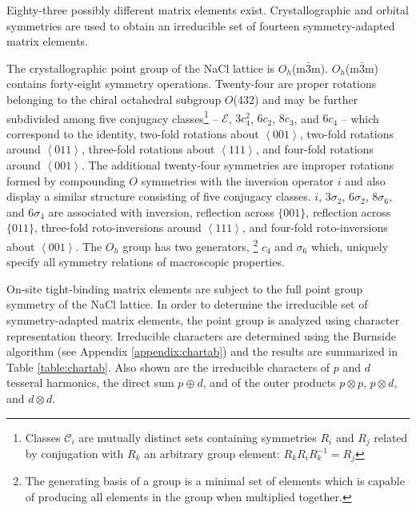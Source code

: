 \documentclass[twocolumn,showpacs,preprintnumbers,superscriptaddress,prb,floatfix,aps,10pt]{revtex4-1}
\newcommand*{\class}{\mathcal{C}}
\newcommand*{\id}{\mathcal{E}}
\begin{document}
Eighty-three possibly different matrix elements exist. Crystallographic and orbital symmetries are used to obtain an irreducible set of fourteen symmetry-adapted matrix elements. 













The crystallographic point group of the NaCl lattice is $O_h$(m$\bar{3}$m). $O_h$(m$\bar{3}$m) contains forty-eight symmetry operations. Twenty-four are proper rotations belonging to the chiral octahedral subgroup $O$(432) and may be further subdivided among five conjugacy classes\footnote{Classes $\class_i$ are mutually distinct sets containing symmetries $R_i$ and $R_j$ related by conjugation with $R_k$ an arbitrary group element: $R_kR_iR_k^{-1}=R_j$} --  $\id$, $3c_4^2$, $6c_2$, $8c_3$, and $6c_4$ -- which correspond to the identity, two-fold rotations about $\left<001\right>$, two-fold rotations around $\left<011\right>$, three-fold rotations about $\left<111\right>$, and four-fold rotations around $\left<001\right>$. The additional twenty-four symmetries are improper rotations formed by compounding $O$ symmetries with the inversion operator $i$ and also display a similar structure consisting of five conjugacy classes. $i$, $3\sigma_2$, $6\sigma_2$, $8\sigma_6$, and $6\sigma_4$ are associated with inversion, reflection across $\{001\}$, reflection across $\{011\}$, three-fold roto-inversions around $\left<111\right>$, and four-fold roto-inversions about $\left<001\right>$. The $O_h$ group has two generators, \footnote{The generating basis of a group is a minimal set of elements which is capable of producing all elements in the group when multiplied together.} $c_4$ and $\sigma_6$ which, uniquely specify all symmetry relations of macroscopic properties.

On-site tight-binding matrix elements are subject to the full point group symmetry of the NaCl lattice. In order to determine the irreducible set of symmetry-adapted matrix elements, the point group is analyzed using character representation theory. Irreducible characters are determined using the Burnside algorithm (see Appendix \ref{appendix:chartab}) and the results are summarized in Table \ref{table:chartab}. Also shown are the irreducible characters of $p$ and $d$ tesseral harmonics, the direct sum $p \oplus d$, and of the outer products $p \otimes p$, $p \otimes d$, and $d \otimes d$. 
\end{document}
